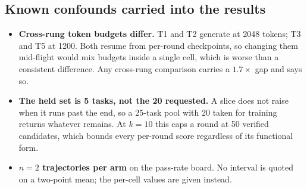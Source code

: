 \subsection{Known confounds carried into the results}

\begin{itemize}[leftmargin=1.4em]
\item \textbf{Cross-rung token budgets differ.} T1 and T2 generate at 2048 tokens; T3 and T5 at
  1200. Both resume from per-round checkpoints, so changing them mid-flight would mix budgets
  inside a single cell, which is worse than a consistent difference. Any cross-rung comparison
  carries a $1.7\times$ gap and says so.
\item \textbf{The held set is 5 tasks, not the 20 requested.} A slice does not raise when it runs
  past the end, so a 25-task pool with 20 taken for training returns whatever remains. At $k=10$
  this caps a round at 50 verified candidates, which bounds every per-round score regardless of
  its functional form.
\item \textbf{$n = 2$ trajectories per arm} on the pass-rate board. No interval is quoted on a
  two-point mean; the per-cell values are given instead.
\end{itemize}
